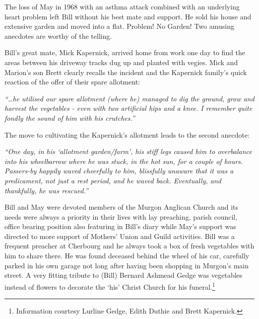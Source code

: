 The loss of May in 1968 with an asthma attack combined with an underlying heart problem left Bill without his best mate and support. He sold his house and extensive garden and moved into a flat. Problem! No Garden! Two amusing anecdotes are worthy of the telling.



Bill's great mate, Mick Kapernick, arrived home from work one day to find the areas between his driveway tracks dug up and planted with vegies. Mick and Marion's son Brett clearly recalls the incident and the Kapernick family's quick reaction of the offer of their spare allotment:



\emph{``\ldots he utilised our spare allotment (where he) managed to dig the ground, grow and harvest the vegetables - even with two artificial hips and a knee. I remember quite fondly the sound of him with his crutches.''}



The move to cultivating the Kapernick's allotment leads to the second anecdote:



\emph{``One day, in his `allotment garden/farm', his stiff legs caused him to overbalance into his wheelbarrow where he was stuck, in the hot sun, for a couple of hours. Passers-by happily waved cheerfully to him, blissfully unaware that it was a predicament, not just a rest period, and he waved back. Eventually, and thankfully, he was rescued.''}



Bill and May were devoted members of the Murgon Anglican Church and its needs were always a priority in their lives with lay preaching, parish council, office bearing position also featuring in Bill's diary while May's support was directed to more support of Mothers' Union and Guild activities. Bill was a frequent preacher at Cherbourg and he always took a box of fresh vegetables with him to share there. He was found deceased behind the wheel of his car, carefully parked in his own garage not long after having been shopping in Murgon's main street. A very fitting tribute to (Bill) Bernard Ashmead Gedge was vegetables instead of flowers to decorate the `his' Christ Church for his funeral.\footnote{Information courtesy Lurline Gedge, Edith Duthie and Brett Kapernick.}








